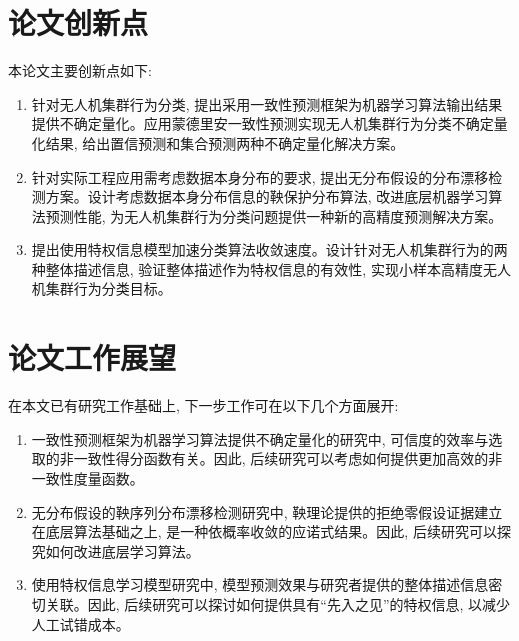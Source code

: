 \section{论文创新点}

本论文主要创新点如下:

\begin{enumerate}
\item 针对无人机集群行为分类, 提出采用一致性预测框架为机器学习算法输出结果提供不确定量化。应用蒙德里安一致性预测实现无人机集群行为分类不确定量化结果, 给出置信预测和集合预测两种不确定量化解决方案。
\item 针对实际工程应用需考虑数据本身分布的要求, 提出无分布假设的分布漂移检测方案。设计考虑数据本身分布信息的鞅保护分布算法, 改进底层机器学习算法预测性能, 为无人机集群行为分类问题提供一种新的高精度预测解决方案。
\item 提出使用特权信息模型加速分类算法收敛速度。设计针对无人机集群行为的两种整体描述信息, 验证整体描述作为特权信息的有效性, 实现小样本高精度无人机集群行为分类目标。
\end{enumerate}

\section{论文工作展望}

在本文已有研究工作基础上, 下一步工作可在以下几个方面展开:

\begin{enumerate}
\item 一致性预测框架为机器学习算法提供不确定量化的研究中, 可信度的效率与选取的非一致性得分函数有关。因此, 后续研究可以考虑如何提供更加高效的非一致性度量函数。
\item 无分布假设的鞅序列分布漂移检测研究中, 鞅理论提供的拒绝零假设证据建立在底层算法基础之上, 是一种依概率收敛的应诺式结果。因此, 后续研究可以探究如何改进底层学习算法。
\item 使用特权信息学习模型研究中, 模型预测效果与研究者提供的整体描述信息密切关联。因此, 后续研究可以探讨如何提供具有“先入之见”的特权信息, 以减少人工试错成本。
\end{enumerate}